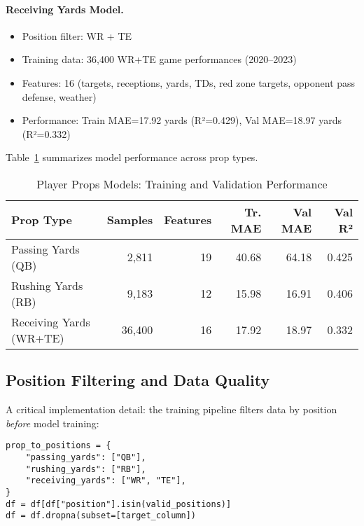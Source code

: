\paragraph{Receiving Yards Model.}
\begin{itemize}
  \item Position filter: WR + TE
  \item Training data: 36,400 WR+TE game performances (2020--2023)
  \item Features: 16 (targets, receptions, yards, TDs, red zone targets, opponent pass defense, weather)
  \item Performance: Train MAE=17.92 yards (R²=0.429), Val MAE=18.97 yards (R²=0.332)
\end{itemize}

Table~\ref{tab:props-models-performance} summarizes model performance across prop types.

\begin{table}[htbp]
\centering
\footnotesize
\caption{Player Props Models: Training and Validation Performance}
\label{tab:props-models-performance}
\setlength{\tabcolsep}{3.5pt}\renewcommand{\arraystretch}{1.12}
\begin{tabular}{@{} l r r r r r @{}}
\toprule
 \textbf{Prop Type} & \textbf{Samples} & \textbf{Features} & \textbf{Tr. MAE} & \textbf{Val MAE} & \textbf{Val R²} \\
\midrule
Passing Yards (QB) & 2,811 & 19 & 40.68 & 64.18 & 0.425 \\
Rushing Yards (RB) & 9,183 & 12 & 15.98 & 16.91 & 0.406 \\
Receiving Yards (WR+TE) & 36,400 & 16 & 17.92 & 18.97 & 0.332 \\
\bottomrule
\end{tabular}
\end{table}

\subsection{Position Filtering and Data Quality}

A critical implementation detail: the training pipeline filters data by position \emph{before} model training:
\begin{verbatim}
prop_to_positions = {
    "passing_yards": ["QB"],
    "rushing_yards": ["RB"],
    "receiving_yards": ["WR", "TE"],
}
df = df[df["position"].isin(valid_positions)]
df = df.dropna(subset=[target_column])
\end{verbatim}

